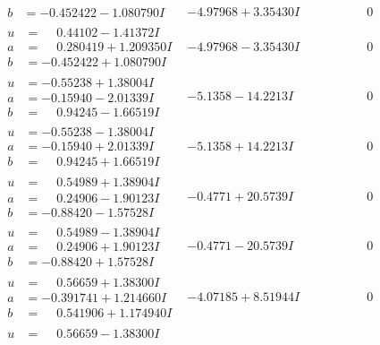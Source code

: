 \documentclass[1p]{elsarticle_modified}
\theoremstyle{definition}
\begin{document}
$$\begin{array}{c|c|c}
\begin{aligned}
b &= -0.452422 - 1.080790 I\end{aligned}
 & -4.97968 + 3.35430 I & \phantom{-0.000000 } 0 \\ \hline\begin{aligned}
u &= \phantom{-}0.44102 - 1.41372 I \\
a &= \phantom{-}0.280419 + 1.209350 I \\
b &= -0.452422 + 1.080790 I\end{aligned}
 & -4.97968 - 3.35430 I & \phantom{-0.000000 } 0 \\ \hline\begin{aligned}
u &= -0.55238 + 1.38004 I \\
a &= -0.15940 - 2.01339 I \\
b &= \phantom{-}0.94245 - 1.66519 I\end{aligned}
 & -5.1358 - 14.2213 I & \phantom{-0.000000 } 0 \\ \hline\begin{aligned}
u &= -0.55238 - 1.38004 I \\
a &= -0.15940 + 2.01339 I \\
b &= \phantom{-}0.94245 + 1.66519 I\end{aligned}
 & -5.1358 + 14.2213 I & \phantom{-0.000000 } 0 \\ \hline\begin{aligned}
u &= \phantom{-}0.54989 + 1.38904 I \\
a &= \phantom{-}0.24906 - 1.90123 I \\
b &= -0.88420 - 1.57528 I\end{aligned}
 & -0.4771 + 20.5739 I & \phantom{-0.000000 } 0 \\ \hline\begin{aligned}
u &= \phantom{-}0.54989 - 1.38904 I \\
a &= \phantom{-}0.24906 + 1.90123 I \\
b &= -0.88420 + 1.57528 I\end{aligned}
 & -0.4771 - 20.5739 I & \phantom{-0.000000 } 0 \\ \hline\begin{aligned}
u &= \phantom{-}0.56659 + 1.38300 I \\
a &= -0.391741 + 1.214660 I \\
b &= \phantom{-}0.541906 + 1.174940 I\end{aligned}
 & -4.07185 + 8.51944 I & \phantom{-0.000000 } 0 \\ \hline\begin{aligned}
u &= \phantom{-}0.56659 - 1.38300 I \\

\end{aligned}
\end{array}$$
\end{document}
